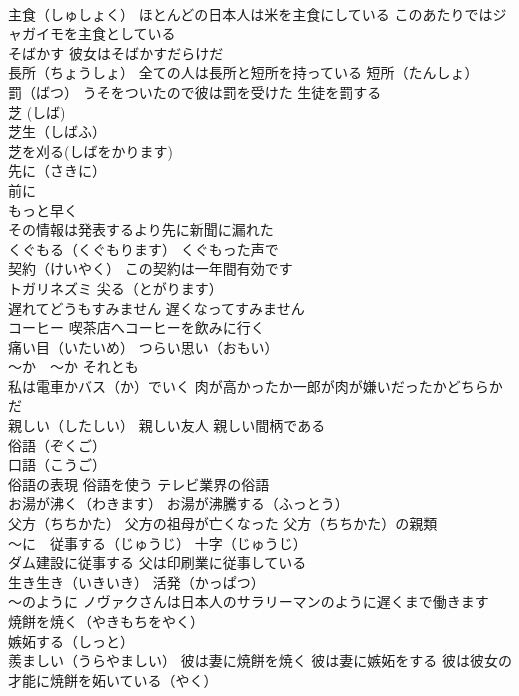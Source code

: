 \documentclass[8pt]{extreport}
\begin{document}
\begin{CJK}{UTF8}{min}
\\	主食（しゅしょく） ほとんどの日本人は米を主食にしている このあたりではジャガイモを主食としている
\\	そばかす 彼女はそばかすだらけだ
\\	長所（ちょうしょ） 全ての人は長所と短所を持っている 短所（たんしょ）
\\	罰（ばつ） うそをついたので彼は罰を受けた 生徒を罰する
\\	芝 (しば) 
\\	芝生（しばふ）
\\	芝を刈る(しばをかります)
\\	先に（さきに）
\\	前に 
\\	もっと早く 
\\	その情報は発表するより先に新聞に漏れた
\\	くぐもる（くぐもります） くぐもった声で
\\	契約（けいやく） この契約は一年間有効です
\\	トガリネズミ 尖る（とがります）
\\	遅れてどうもすみません 遅くなってすみません
\\	コーヒー 喫茶店へコーヒーを飲みに行く
\\	痛い目（いたいめ） つらい思い（おもい）
\\	～か　～か それとも 
\\	私は電車かバス（か）でいく 肉が高かったか一郎が肉が嫌いだったかどちらかだ
\\	親しい（したしい） 親しい友人 親しい間柄である
\\	俗語（ぞくご）
\\	口語（こうご）
\\	俗語の表現 俗語を使う テレビ業界の俗語
\\	お湯が沸く（わきます） お湯が沸騰する（ふっとう）
\\	父方（ちちかた） 父方の祖母が亡くなった 父方（ちちかた）の親類
\\	～に　従事する（じゅうじ） 十字（じゅうじ）
\\	ダム建設に従事する 父は印刷業に従事している
\\	生き生き（いきいき） 活発（かっぱつ）
\\	～のように ノヴァクさんは日本人のサラリーマンのように遅くまで働きます
\\	焼餅を焼く（やきもちをやく）
\\	嫉妬する（しっと）
\\	羨ましい（うらやましい） 彼は妻に焼餅を焼く 彼は妻に嫉妬をする 彼は彼女の才能に焼餅を妬いている（やく）

\end{CJK}
\end{document}
